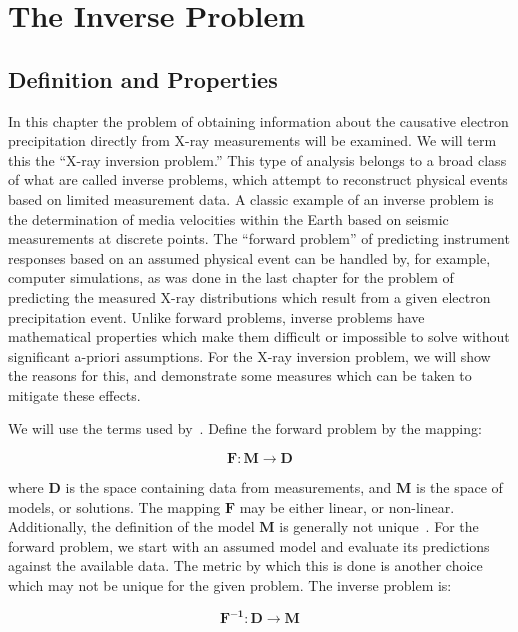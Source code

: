 \chapter{The Inverse Problem}

\section{Definition and Properties}

In this chapter the problem of obtaining information about the causative electron precipitation directly from X-ray measurements will be examined. We will term this the ``X-ray inversion problem.'' This type of analysis belongs to a broad class of what are called inverse problems, which attempt to reconstruct physical events based on limited measurement data.  A classic example of an inverse problem is the determination of media velocities within the Earth based on seismic measurements at discrete points. The ``forward problem'' of predicting instrument responses based on an assumed physical event can be handled by, for example, computer simulations, as was done in the last chapter for the problem of predicting the measured X-ray distributions which result from a given electron precipitation event. Unlike forward problems, inverse problems have mathematical properties which make them difficult or impossible to solve without  significant a-priori assumptions. For the X-ray inversion problem, we will show the reasons for this, and demonstrate some measures which can be taken to mitigate these effects.

We will use the terms used by~\citet{Tarantola2004}. Define the forward problem by the mapping:

\begin{equation}
\mathbf{F}:\mathbf{M} \rightarrow \mathbf{D}
\end{equation}

where $\mathbf{D}$ is the space containing data from measurements, and $\mathbf{M}$ is the space of models, or solutions. The mapping $\mathbf{F}$ may be either linear, or non-linear. Additionally, the definition of the model $\mathbf{M}$ is generally not unique~\citep{Tarantola2004}. For the forward problem, we start with an assumed model and evaluate its predictions against the available data. The metric by which this is done is another choice which may not be unique for the given problem. The inverse problem is:

\begin{equation}
\mathbf{F^{-1}}:\mathbf{D} \rightarrow \mathbf{M}
\end{equation}

